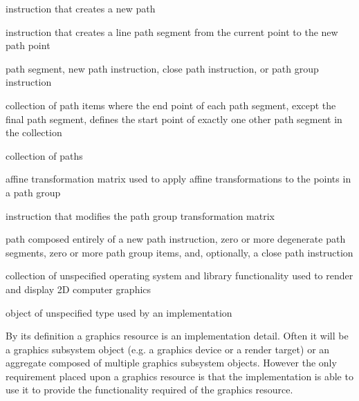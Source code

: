 %
 instruction that creates a new path

%
 instruction that creates a line path segment from the current point to the new path point

%
path segment, new path instruction, close path instruction, or path group instruction

%
collection of path items where the end point of each path segment, except the final path segment, defines the start point of exactly one other path segment in the collection

%
collection of paths

%
affine transformation matrix used to apply affine transformations to the points in a path group

%
instruction that modifies the path group transformation matrix

%
path composed entirely of a new path instruction, zero or more degenerate path segments, zero or more path group items, and, optionally, a close path instruction


%
collection of unspecified operating system and library functionality used to render and display 2D computer graphics

%
 object of unspecified type used by an implementation
\begin{note}
By its definition a graphics resource is an implementation detail. Often it will be a graphics subsystem object (e.g. a graphics device or a render target) or an aggregate composed of multiple graphics subsystem objects. However the only requirement placed upon a graphics resource is that the implementation is able to use it to provide the functionality required of the graphics resource.
\end{note}

